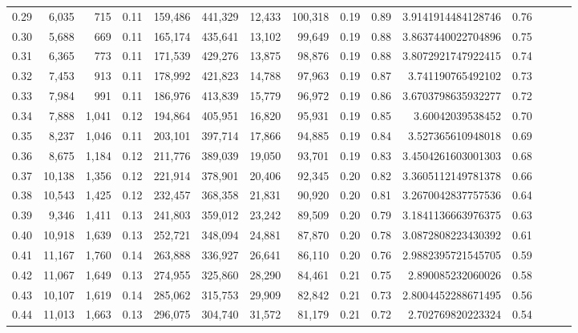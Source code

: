 \begin{tabular}{rrrrrrrrrrrrrrr}
0.29 &   6,035 &    715 &  0.11 &  159,486 &  441,329 &   12,433 &  100,318 &  0.19 &  0.89 &   3.9141914484128746 &      0.76 \\
0.30 &   5,688 &    669 &  0.11 &  165,174 &  435,641 &   13,102 &   99,649 &  0.19 &  0.88 &   3.8637440022704896 &      0.75 \\
0.31 &   6,365 &    773 &  0.11 &  171,539 &  429,276 &   13,875 &   98,876 &  0.19 &  0.88 &   3.8072921747922415 &      0.74 \\
0.32 &   7,453 &    913 &  0.11 &  178,992 &  421,823 &   14,788 &   97,963 &  0.19 &  0.87 &    3.741190765492102 &      0.73 \\
0.33 &   7,984 &    991 &  0.11 &  186,976 &  413,839 &   15,779 &   96,972 &  0.19 &  0.86 &   3.6703798635932277 &      0.72 \\
0.34 &   7,888 &  1,041 &  0.12 &  194,864 &  405,951 &   16,820 &   95,931 &  0.19 &  0.85 &     3.60042039538452 &      0.70 \\
0.35 &   8,237 &  1,046 &  0.11 &  203,101 &  397,714 &   17,866 &   94,885 &  0.19 &  0.84 &    3.527365610948018 &      0.69 \\
0.36 &   8,675 &  1,184 &  0.12 &  211,776 &  389,039 &   19,050 &   93,701 &  0.19 &  0.83 &   3.4504261603001303 &      0.68 \\
0.37 &  10,138 &  1,356 &  0.12 &  221,914 &  378,901 &   20,406 &   92,345 &  0.20 &  0.82 &   3.3605112149781378 &      0.66 \\
0.38 &  10,543 &  1,425 &  0.12 &  232,457 &  368,358 &   21,831 &   90,920 &  0.20 &  0.81 &   3.2670042837757536 &      0.64 \\
0.39 &   9,346 &  1,411 &  0.13 &  241,803 &  359,012 &   23,242 &   89,509 &  0.20 &  0.79 &   3.1841136663976375 &      0.63 \\
0.40 &  10,918 &  1,639 &  0.13 &  252,721 &  348,094 &   24,881 &   87,870 &  0.20 &  0.78 &   3.0872808223430392 &      0.61 \\
0.41 &  11,167 &  1,760 &  0.14 &  263,888 &  336,927 &   26,641 &   86,110 &  0.20 &  0.76 &   2.9882395721545705 &      0.59 \\
0.42 &  11,067 &  1,649 &  0.13 &  274,955 &  325,860 &   28,290 &   84,461 &  0.21 &  0.75 &    2.890085232060026 &      0.58 \\
0.43 &  10,107 &  1,619 &  0.14 &  285,062 &  315,753 &   29,909 &   82,842 &  0.21 &  0.73 &   2.8004452288671495 &      0.56 \\
0.44 &  11,013 &  1,663 &  0.13 &  296,075 &  304,740 &   31,572 &   81,179 &  0.21 &  0.72 &    2.702769820223324 &      0.54 \\

\end{tabular}
